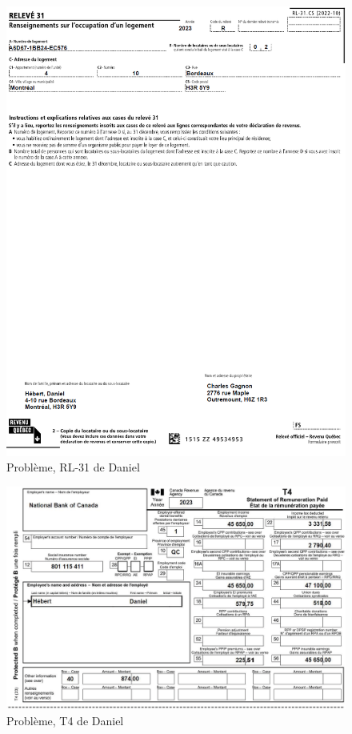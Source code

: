 \begin{figure}
	\centering
	\includegraphics[width=.9\textwidth]{probleme/chapitre-4/Daniel-RL31.png}
	\caption{Problème, RL-31 de Daniel}
	\label{fig:chap4ProblemeDanielRL31}
\end{figure}
\begin{figure}
	\centering
	\includegraphics[width=.9\textwidth]{probleme/chapitre-4/Daniel-T4.png}
	\caption{Problème, T4 de Daniel}
	\label{fig:chap4ProblemeDanielT4}
\end{figure}
